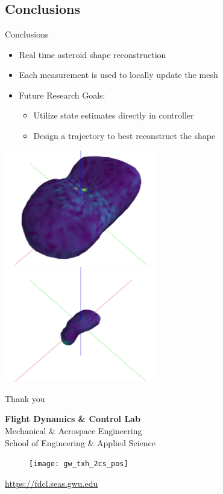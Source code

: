 \documentclass[11pt,professionalfonts,aspectratio=169]{beamer}
\begin{document}
\section*{}
\subsection*{Conclusions}

\begin{frame}{Conclusions}
    \begin{itemize}
        \item Real time asteroid shape reconstruction 
        \item Each measurement is used to locally update the mesh
        \item Future Research Goals:
            \begin{itemize}
                \item Utilize state estimates directly in controller
                \item Design a trajectory to best reconstruct the shape
            \end{itemize}
    \end{itemize} 

    \begin{center}
        \includegraphics[width=0.5\textwidth,keepaspectratio]{figures/castalia/final_az=45_el=30.jpg}~
        \includegraphics[width=0.5\textwidth, keepaspectratio]{figures/itokawa/final_az=45_el=30.jpg}
    \end{center}
\end{frame}

\begin{frame}[c]{Thank you}
  \centering
  
  \textbf{\large Flight Dynamics \& Control Lab} \\
  Mechanical \& Aerospace Engineering \\
  School of Engineering \& Applied Science
  
  \begin{figure} %
        \texttt{[image: gw\_txh\_2cs\_pos]}
    \end{figure}
  
  \url{https://fdcl.seas.gwu.edu}
\end{frame}
\end{document}
